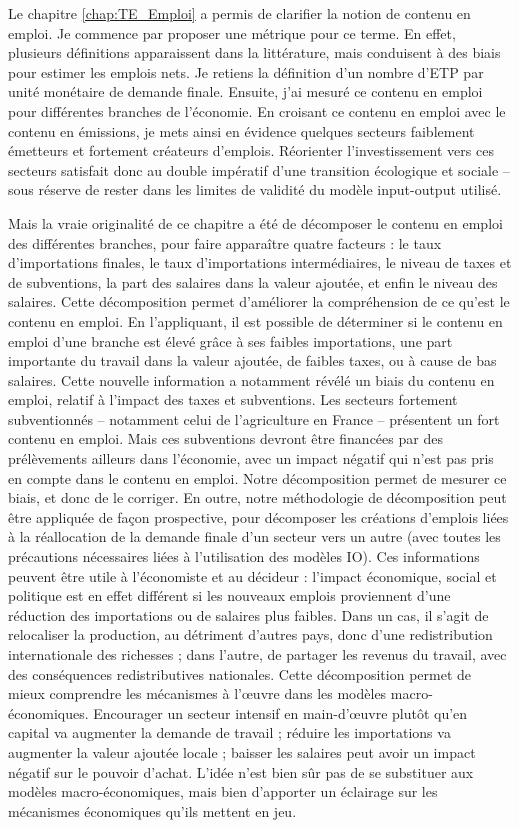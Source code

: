 Le chapitre \ref{chap:TE_Emploi} a permis de clarifier la notion de contenu en emploi.  Je commence par proposer une métrique pour ce terme. En effet, plusieurs définitions apparaissent dans la littérature, mais conduisent à des biais pour estimer les emplois nets. Je retiens la définition d’un nombre d’ETP par unité monétaire de demande finale.
Ensuite, j’ai mesuré ce contenu en emploi pour différentes branches de l’économie. En croisant ce contenu en emploi avec le contenu en émissions, je mets ainsi en évidence quelques secteurs faiblement émetteurs et fortement créateurs d’emplois. Réorienter l’investissement vers ces secteurs satisfait donc au double impératif d’une transition écologique et sociale – sous réserve de rester dans les limites de validité du modèle input-output utilisé.

Mais la vraie originalité de ce chapitre a été de décomposer le contenu en emploi des différentes branches, pour faire apparaître quatre facteurs : le taux d’importations finales, le taux d’importations intermédiaires, le niveau de taxes et de subventions, la part des salaires dans la valeur ajoutée, et enfin le niveau des salaires.
Cette décomposition permet d’améliorer la compréhension de ce qu’est le contenu en emploi. En l’appliquant, il est possible de déterminer si le contenu en emploi d’une branche est élevé grâce à ses faibles importations, une part importante du travail dans la valeur ajoutée, de faibles taxes, ou à cause de bas salaires.
Cette nouvelle information a notamment révélé un biais du contenu en emploi, relatif à l’impact des taxes et subventions. Les secteurs fortement subventionnés -- notamment celui de l'agriculture en France -- présentent un fort contenu en emploi. Mais ces subventions devront être financées par des prélèvements ailleurs dans l’économie, avec un impact négatif qui n’est pas pris en compte dans le contenu en emploi. Notre décomposition permet de mesurer ce biais, et donc de le corriger. 
En outre, notre méthodologie de décomposition peut être appliquée de façon prospective, pour décomposer les créations d’emplois liées à la réallocation de la demande finale d’un secteur vers un autre (avec toutes les précautions nécessaires liées à l’utilisation des modèles IO). Ces informations peuvent être utile à l’économiste et au décideur : l’impact économique, social et politique est en effet différent si les nouveaux emplois proviennent d’une réduction des importations ou de salaires plus faibles. Dans un cas, il s’agit de relocaliser la production, au détriment d’autres pays, donc d’une redistribution internationale des richesses ; dans l’autre, de partager les revenus du travail, avec des conséquences redistributives nationales.
Cette décomposition permet de mieux comprendre les mécanismes à l’œuvre dans les modèles macro-économiques. Encourager un secteur intensif en main-d’œuvre plutôt qu’en capital va augmenter la demande de travail ; réduire les importations va augmenter la valeur ajoutée locale ; baisser les salaires peut avoir un impact négatif sur le pouvoir d’achat. L’idée n’est bien sûr pas de se substituer aux modèles macro-économiques, mais bien d’apporter un éclairage sur les mécanismes économiques qu’ils mettent en jeu.




